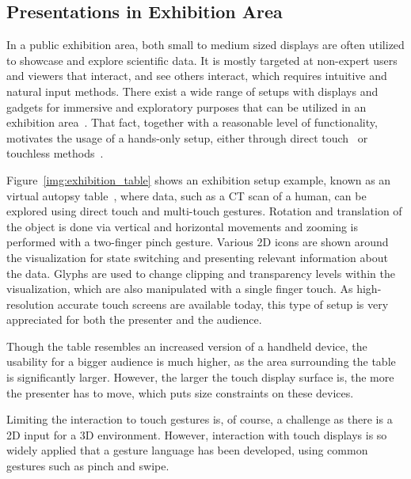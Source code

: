 \documentclass[review,journal]{vgtc}         %
\begin{document}
\subsection{Presentations in Exhibition Area} \label{sec:exhibition}
In a public exhibition area, both small to medium sized displays are often utilized to showcase and explore scientific data.
It is mostly targeted at non-expert users and viewers that interact, and see others interact, which requires intuitive and natural input methods.
There exist a wide range of setups with displays and gadgets for immersive and exploratory purposes that can be utilized in an exhibition area~\cite{Laha:2013:VCB:2491367.2491368, conf/egve/KruszynskiL08}.
That fact, together with a reasonable level of functionality, motivates the usage of a hands-only setup, either through direct touch~\cite{Klein:2012:DSD:2322389.2322403} or touchless methods~\cite{O'hara:2013:NTP:2442106.2442111}.

Figure~\ref{img:exhibition_table} shows an exhibition setup example, known as an virtual autopsy table~\cite{LRFPY11}, where data, such as a CT scan of a human, can be explored using direct touch and multi-touch gestures.
Rotation and translation of the object is done via vertical and horizontal movements and zooming is performed with a two-finger pinch gesture.
Various 2D icons are shown around the visualization for state switching and presenting relevant information about the data.
Glyphs are used to change clipping and transparency levels within the visualization, which are also manipulated with a single finger touch.
As high-resolution accurate touch screens are available today, this type of setup is very appreciated for both the presenter and the audience.

Though the table resembles an increased version of a handheld device, the usability for a bigger audience is much higher, as the area surrounding the table is significantly larger.
However, the larger the touch display surface is, the more the presenter has to move, which puts size constraints on these devices.

Limiting the interaction to touch gestures is, of course, a challenge as there is a 2D input for a 3D environment.
However, interaction with touch displays is so widely applied that a gesture language has been developed, using common gestures such as pinch and swipe.
\end{document}
